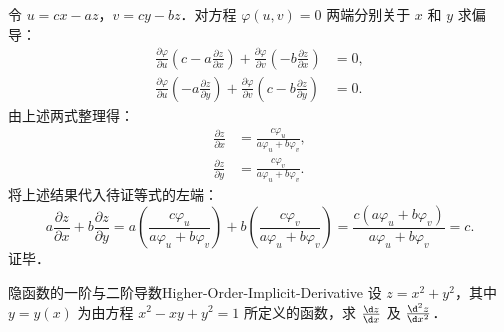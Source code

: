 \begin{myproof}
    令 $u = cx - az$，$v = cy - bz$．对方程 $\varphi(u, v) = 0$ 两端分别关于 $x$ 和 $y$ 求偏导：
    \begin{equation}
        \begin{aligned}
            \frac{\partial \varphi}{\partial u} \left( c - a \frac{\partial z}{\partial x} \right) + \frac{\partial \varphi}{\partial v} \left( -b \frac{\partial z}{\partial x} \right) & = 0, \\
            \frac{\partial \varphi}{\partial u} \left( -a \frac{\partial z}{\partial y} \right) + \frac{\partial \varphi}{\partial v} \left( c - b \frac{\partial z}{\partial y} \right) & = 0.
        \end{aligned}
    \end{equation}
    由上述两式整理得：
    \begin{equation}
        \begin{aligned}
            \frac{\partial z}{\partial x} & = \frac{c \varphi_u}{a \varphi_u + b \varphi_v}, \\
            \frac{\partial z}{\partial y} & = \frac{c \varphi_v}{a \varphi_u + b \varphi_v}.
        \end{aligned}
    \end{equation}
    将上述结果代入待证等式的左端：
    \begin{equation}
        a \frac{\partial z}{\partial x} + b \frac{\partial z}{\partial y} = a \left( \frac{c \varphi_u}{a \varphi_u + b \varphi_v} \right) + b \left( \frac{c \varphi_v}{a \varphi_u + b \varphi_v} \right) = \frac{c(a \varphi_u + b \varphi_v)}{a \varphi_u + b \varphi_v} = c.
    \end{equation}
    证毕．
\end{myproof}

\begin{problem}{隐函数的一阶与二阶导数}{Higher-Order-Implicit-Derivative}
    设 $z = x^2 + y^2$，其中 $y = y(x)$ 为由方程 $x^2 - xy + y^2 = 1$ 所定义的函数，求 $\frac{\d z}{\d x}$ 及 $\frac{\d^2 z}{\d x^2}$．
\end{problem}

